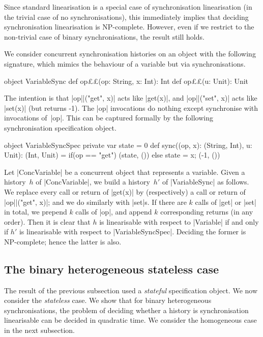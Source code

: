 Since standard linearisation is a special case of synchronisation
linearisation (in the trivial case of no synchronisations), this immediately
implies that deciding synchronisation linearisation is NP-complete.  However,
even if we restrict to the non-trivial case of binary synchronisations, the
result still holds.

We consider concurrent synchronisation histories on an object with the
following signature, which mimics the behaviour of a variable but via
synchronisations. 
%
\begin{scala}
object VariableSync{
  def op££(op: String, x: Int): Int
  def op££(u: Unit): Unit
} 
\end{scala}
%
The intention is that |op||("get", x)| acts like |get(x)|, and
|op||("set", x)| acts like |set(x)| (but returns -1).  The |op|
invocations do nothing except synchronise with invocations of~|op|.  This
can be captured formally by the following synchronisation specification
object.
%
\begin{scala}
object VariableSyncSpec{
  private var state = 0
  def sync((op, x): (String, Int), u: Unit): (Int, Unit) = 
    if(op == "get") (state, ()) else{ state = x; (-1, ()) }
}
\end{scala}


Let |ConcVariable| be a concurrent object that represents a variable.  Given a
history~$h$ of |ConcVariable|, we build a history~$h'$
of |VariableSync| as follows.  We replace every call or return of |get(x)| by
(respectively) a call or return of |op||("get", x)|; and we do similarly
with |set|s.  If there are $k$ calls of |get| or |set| in total, we prepend
$k$ calls of |op|, and append $k$ corresponding returns (in any order).
%
Then it is clear that $h$ is linearisable with respect to |Variable| if and
only if $h'$ is linearisable with respect to |VariableSyncSpec|.  Deciding the
former is NP-complete; hence the latter is also. 




\subsection{The binary heterogeneous stateless case}
\label{sec:binary-heterogeneous}

The result of the previous subsection used a \emph{stateful} specification
object.  We now consider the \emph{stateless} case.  We show that for binary
heterogeneous synchronisations, the problem of deciding whether a history is
synchronisation linearisable can be decided in quadratic time.  We consider
the homogeneous case in the next subsection.

